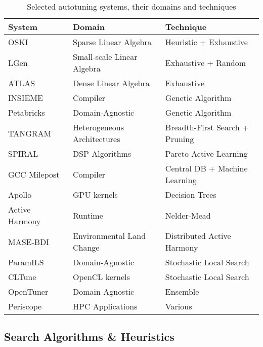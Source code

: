 \begin{table}[htpb]
    \centering
    \begin{tabular}{@{}lll@{}}
        \toprule
        System & Domain & Technique \\ \midrule
        OSKI~\cite{vuduc2005oski} & Sparse Linear Algebra & Heuristic + Exhaustive \\
        LGen~\cite{spampinato2014basic} & Small-scale Linear Algebra & Exhaustive + Random \\
        ATLAS~\cite{dongarra1998automatically} & Dense Linear Algebra & Exhaustive \\
        INSIEME~\cite{jordan2012multi} & Compiler & Genetic Algorithm \\
        Petabricks~\cite{ansel2009petabricks} & Domain-Agnostic & Genetic Algorithm\\
        TANGRAM~\cite{chang2016efficient} & Heterogeneous Architectures & Breadth-First Search + Pruning \\
        SPIRAL~\cite{puschel2005spiral} & DSP Algorithms & Pareto Active Learning \\
        GCC Milepost~\cite{fursin2011milepost} & Compiler & Central DB + Machine Learning \\
        Apollo~\cite{beckingsale2017apollo} & GPU kernels & Decision Trees \\
        Active Harmony~\cite{tapus2002active} & Runtime & Nelder-Mead \\
        MASE-BDI~\cite{coelho2016mase} & Environmental Land Change & Distributed Active Harmony~\cite{tapus2002active} \\
        ParamILS~\cite{hutter2009paramils} & Domain-Agnostic & Stochastic Local Search \\
        CLTune~\cite{nugteren2015cltune} & OpenCL kernels & Stochastic Local Search\\
        OpenTuner~\cite{ansel2014opentuner} & Domain-Agnostic & Ensemble \\
        Periscope~\cite{gerndt2017multi} & HPC Applications & Various \\
        \bottomrule
    \end{tabular}
    \caption{Selected autotuning systems, their domains and techniques}
\end{table}

\subsection{Search Algorithms \& Heuristics}

